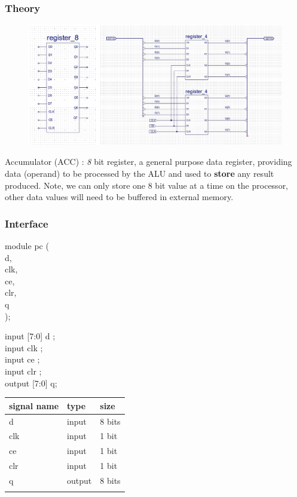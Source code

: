 \documentclass[11pt]{article}
\begin{document}
\subsubsection{Theory}
\label{sec:orge27c893}
\begin{figure}[htbp]
\centering
\includegraphics[width=.9\linewidth]{./images/reg8.jpg}
\caption{\label{fig:org474119b}
}
\end{figure}
Accumulator (ACC) : \emph{8} bit register, a general purpose data register, providing data (operand) to be processed by the ALU and used to \textbf{store} any result produced. Note, we can only store one 8 bit value at a time on the processor, other data values will need to be buffered in external memory.
\subsubsection{Interface}
\label{sec:org4e53537}
module pc (\\
d,\\
clk,\\
ce,\\
clr,\\
q\\
);

input [7:0] d     ; \\
input clk         ;   \\
input ce      ; \\
input clr     ; \\
output [7:0] q; \\

\begin{center}
\begin{tabular}{lll}
signal name & type & size\\
\hline
d & input & 8 bits\\
clk & input & 1 bit\\
ce & input & 1 bit\\
clr & input & 1 bit\\
q & output & 8 bits\\
 &  & \\
\hline
\end{tabular}
\end{center}
\end{document}
